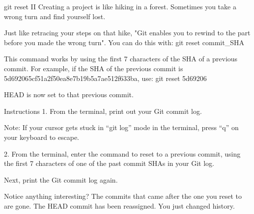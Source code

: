 git reset II
    Creating a project is like hiking in a forest. Sometimes you take a wrong turn and find yourself lost.

    Just like retracing your steps on that hike, "Git enables you to rewind to the part before you made the wrong turn". You can do this with:
        git reset commit_SHA

    This command works by using the first 7 characters of the SHA of a previous commit. For example, if the SHA of the previous commit is 5d692065cf51a2f50ea8e7b19b5a7ae512f633ba, use:
        git reset 5d69206
    
    HEAD is now set to that previous commit.

Instructions
    1.
    From the terminal, print out your Git commit log.

    Note: If your cursor gets stuck in “git log” mode in the terminal, press “q” on your keyboard to escape.

    2.
    From the terminal, enter the command to reset to a previous commit, using the first 7 characters of one of the past commit SHAs in your Git log.

    Next, print the Git commit log again.

    Notice anything interesting? The commits that came after the one you reset to are gone. The HEAD commit has been reassigned. You just changed history.